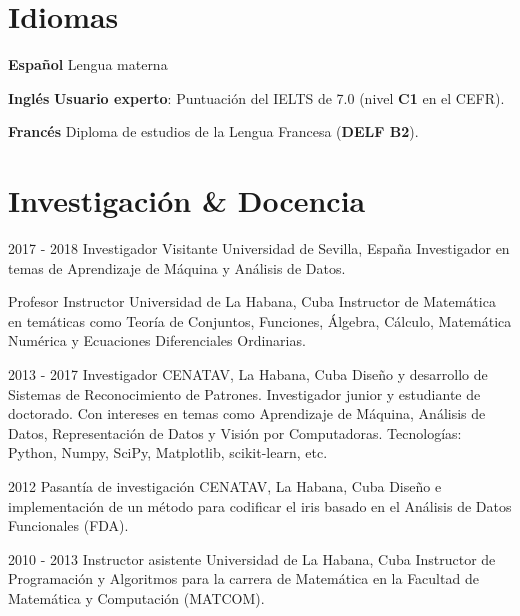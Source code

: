 \documentclass[]{friggeri-cv}
\begin{document}
\section{Idiomas}
\begin{entrylist}
  \entry
    {\textbf{Español}}
    {}
    {}
    {Lengua materna}

  \entry
    {\textbf{Inglés}}
    {}
    {}
    {
    \textbf{Usuario experto}: Puntuación del IELTS de 7.0 (nivel \textbf{C1} en el CEFR).%
    }

  \entry
    {\textbf{Francés}}
    {}
    {}
    {Diploma de estudios de la Lengua Francesa (\textbf{DELF B2}).}
\end{entrylist}


\section{Investigación \& Docencia}
\begin{entrylist}
  \entry
    {2017 - 2018}
    {Investigador Visitante}
    {Universidad de Sevilla, España}
    {Investigador en temas de Aprendizaje de Máquina y Análisis de Datos.\\}

  \entry
    {}
    {Profesor Instructor}
    {Universidad de La Habana, Cuba}
    {Instructor de Matemática en temáticas como Teoría de Conjuntos, Funciones, Álgebra, Cálculo, Matemática Numérica y Ecuaciones Diferenciales Ordinarias.\\}
\end{entrylist}

\begin{entrylist}
  \entry
    {2013 - 2017}
    {Investigador}
    {CENATAV, La Habana, Cuba}
    {Diseño y desarrollo de Sistemas de Reconocimiento de Patrones. Investigador junior y estudiante de doctorado. Con intereses en temas como Aprendizaje de Máquina, Análisis de Datos, Representación de Datos y Visión por Computadoras. Tecnologías: Python, Numpy, SciPy, Matplotlib, scikit-learn, etc.\\}

  \entry
    {2012}
    {Pasantía de investigación}
    {CENATAV, La Habana, Cuba}
    {Diseño e implementación de un método para codificar el iris basado en el Análisis de Datos Funcionales (FDA).\\}

  \entry
    {2010 - 2013}
    {Instructor asistente}
    {Universidad de La Habana, Cuba}
    {Instructor  de Programación y Algoritmos para la carrera de Matemática en la Facultad de Matemática y Computación (MATCOM).\\}
\end{entrylist}
\end{document}
